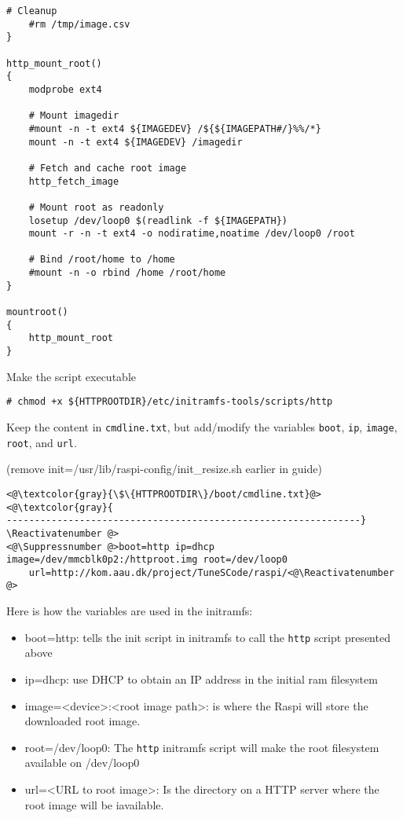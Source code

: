 \begin{lstlisting}[]
    # Cleanup
    #rm /tmp/image.csv
}

http_mount_root()
{
    modprobe ext4

    # Mount imagedir
    #mount -n -t ext4 ${IMAGEDEV} /${${IMAGEPATH#/}%%/*}
    mount -n -t ext4 ${IMAGEDEV} /imagedir

    # Fetch and cache root image
    http_fetch_image

    # Mount root as readonly
    losetup /dev/loop0 $(readlink -f ${IMAGEPATH})
    mount -r -n -t ext4 -o nodiratime,noatime /dev/loop0 /root

    # Bind /root/home to /home
    #mount -n -o rbind /home /root/home
}

mountroot()
{
    http_mount_root
}
\end{lstlisting}
\FloatBarrier
\vspace{-5mm}

Make the script executable
\begin{lstlisting}[]
# chmod +x ${HTTPROOTDIR}/etc/initramfs-tools/scripts/http
\end{lstlisting}
\FloatBarrier
\vspace{-5mm}

Keep the content in \texttt{cmdline.txt}, but add/modify the variables
\texttt{boot}, \texttt{ip}, \texttt{image}, \texttt{root}, and \texttt{url}.


(remove init=/usr/lib/raspi-config/init\_resize.sh earlier in guide)
\Suppressnumber\begin{lstlisting}[]
<@\textcolor{gray}{\$\{HTTPROOTDIR\}/boot/cmdline.txt}@>
<@\textcolor{gray}{
---------------------------------------------------------------}
\Reactivatenumber @>
<@\Suppressnumber @>boot=http ip=dhcp image=/dev/mmcblk0p2:/httproot.img root=/dev/loop0
    url=http://kom.aau.dk/project/TuneSCode/raspi/<@\Reactivatenumber @>
\end{lstlisting}
\FloatBarrier
\vspace{-5mm}

Here is how the variables are used in the initramfs:
\begin{itemize}
    \item boot=http: tells the init script in initramfs to call the \texttt{http} script presented above
    \item ip=dhcp: use \ac{DHCP} to obtain an \ac{IP} address in the initial ram filesystem
    \item image=<device>:<root image path>: is where the \ac{Raspi} will store the downloaded root image.
    \item root=/dev/loop0: The \texttt{http} initramfs script will make the root filesystem available on /dev/loop0
    \item url=<URL to root image>: Is the directory on a \ac{HTTP} server where the root image will be iavailable.
\end{itemize}


